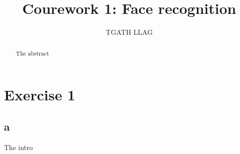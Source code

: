 \documentclass[10pt,technote]{IEEEtran}
\title{Courework 1: Face recognition }
\author{TGATH LLAG}
\begin{document}
\maketitle
\begin{abstract}
The abstract
\end{abstract}

\section{Exercise 1}
\subsection{a}


The intro
%
%
\end{document}
